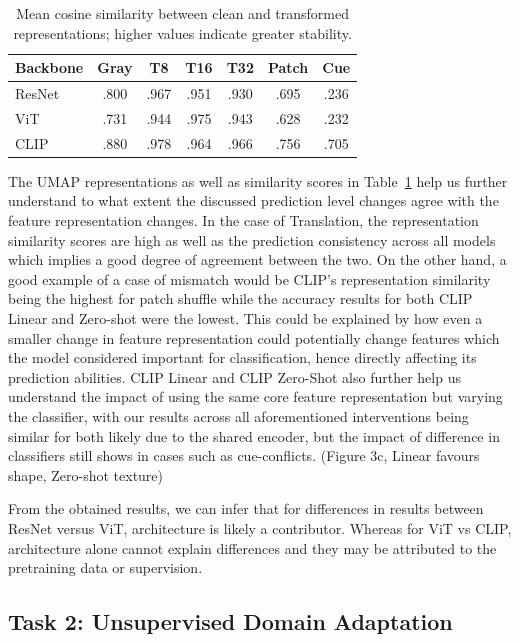 \documentclass{article}
\begin{document}
\begin{table}[t]
\centering
\caption{Mean cosine similarity between clean and transformed representations; higher values indicate greater stability.}
\label{tab:repr_stability}
\scriptsize
\setlength{\tabcolsep}{3pt}
\begin{tabular}{lcccccc}
\toprule
Backbone & Gray & T8 & T16 & T32 & Patch & Cue \\
\midrule
ResNet & .800 & .967 & .951 & .930 & .695 & .236 \\
ViT    & .731 & .944 & .975 & .943 & .628 & .232 \\
CLIP   & .880 & .978 & .964 & .966 & .756 & .705 \\
\bottomrule
\end{tabular}
\end{table}

The UMAP representations as well as similarity scores in Table~\ref{tab:repr_stability} help us further understand to what extent the discussed prediction level changes agree with the feature representation changes. In the case of Translation, the representation similarity scores are high as well as the prediction consistency across all models which implies a good degree of agreement between the two. On the other hand, a good example of a case of mismatch would be CLIP's representation similarity being the highest for patch shuffle while the accuracy results for both CLIP Linear and Zero-shot were the lowest. This could be explained by how even a smaller change in feature representation could potentially change features which the model considered important for classification, hence directly affecting its prediction abilities. CLIP Linear and CLIP Zero-Shot also further help us understand the impact of using the same core feature representation but varying the classifier, with our results across all aforementioned interventions being similar for both likely due to the shared encoder, but the impact of difference in classifiers still shows in cases such as cue-conflicts. (Figure 3c, Linear favours shape, Zero-shot texture)  

From the obtained results, we can infer that for differences in results between ResNet versus ViT, architecture is likely a contributor. Whereas for ViT vs CLIP, architecture alone cannot explain differences and they may be attributed to the pretraining data or supervision.


\subsection{Task 2: Unsupervised Domain Adaptation}
\label{subsec:results-task2}
\end{document}
